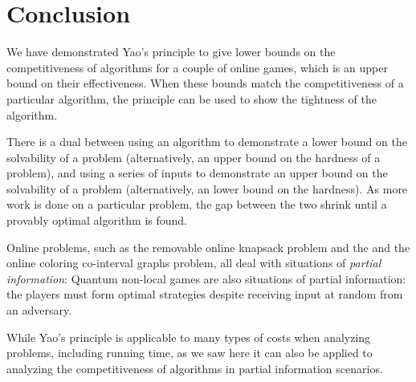 \section{Conclusion}
We have demonstrated Yao's principle to give lower bounds on the competitiveness of algorithms for a couple of online games, which is an upper bound on their effectiveness. When these bounds match the competitiveness of a particular algorithm, the principle can be used to show the tightness of the algorithm.

There is a dual between using an algorithm to demonstrate a lower bound on the solvability of a problem (alternatively, an upper bound on the hardness of a problem), and using a series of inputs to demonstrate an upper bound on the solvability of a problem (alternatively, an lower bound on the hardness). As more work is done on a particular problem, the gap between the two shrink until a provably optimal algorithm is found.

Online problems, such as the removable online knapsack problem and the and the online coloring co-interval graphs problem, all deal with situations of \emph{partial information}: Quantum non-local games are also situations of partial information: the players must form optimal strategies despite receiving input at random from an adversary. 

While Yao's principle is applicable to many types of costs when analyzing problems, including running time, as we saw here it can also be applied to analyzing the competitiveness of algorithms in partial information scenarios.
